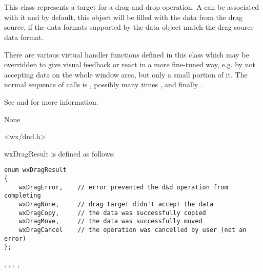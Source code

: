 \section{}\label{wxdroptarget}

This class represents a target for a drag and drop operation. A 
can be associated with it and by default, this object will be filled with the data from the
drag source, if the data formats supported by the data object match the drag source data 
format.

There are various virtual handler functions defined in this class which may be overridden
to give visual feedback or react in a more fine-tuned way, e.g. by not accepting data on
the whole window area, but only a small portion of it. The normal sequence of calls is
, possibly many times ,
 and finally .

See  and 
for more information.


None


<wx/dnd.h>


wxDragResult is defined as follows:

\begin{verbatim}
enum wxDragResult
{
    wxDragError,    // error prevented the d&d operation from completing
    wxDragNone,     // drag target didn't accept the data
    wxDragCopy,     // the data was successfully copied
    wxDragMove,     // the data was successfully moved
    wxDragCancel    // the operation was cancelled by user (not an error)
};
\end{verbatim}


, 
, ,
, 


\label{wxdroptargetwxdroptarget}

